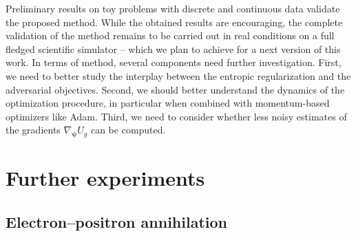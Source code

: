 \documentclass{article}
\newcommand{\bfpsi}{{\bm \psi}}
\theoremstyle{plain}
\begin{document}
Preliminary results on toy problems with discrete and continuous data validate
the proposed method. While the obtained results are encouraging, the complete
validation of the method remains to be carried out in real conditions on a full
fledged scientific simulator -- which we plan to achieve for a next version of
this work. In terms of method, several components need further investigation.
First, we need to better study the interplay between the entropic regularization and the
adversarial objectives. Second, we should better understand the dynamics of the
optimization procedure, in particular when combined with momentum-based
optimizers like Adam. Third, we need to consider whether less noisy estimates of
the gradients $\nabla_\bfpsi U_g$ can be computed.









\appendix

\section{Further experiments}

\subsection{Electron--positron annihilation}
\end{document}
